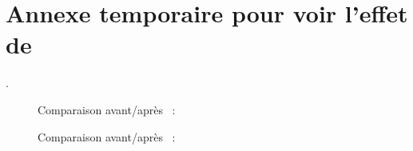 \chapter{Annexe temporaire pour voir l'effet de }.

\begin{figure}[H]

\caption{Comparaison avant/après ~: }
\label{WordCount-emplace-1.fig}
\end{figure}


\begin{figure}[H]

\caption{Comparaison avant/après ~: }
\label{WordCount-emplace-3.fig}
\end{figure}

